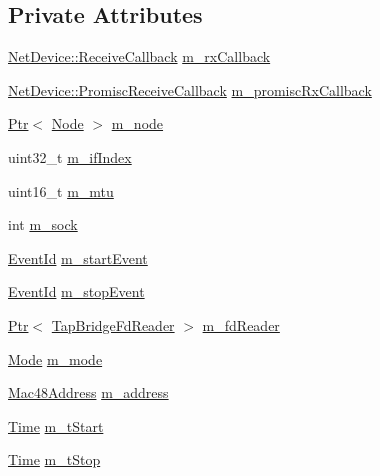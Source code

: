 \subsection*{Private Attributes}
\begin{DoxyCompactItemize}
\item 
\hyperlink{classns3_1_1NetDevice_ad5e5e1ca187472bc2ba99575d8def568}{Net\+Device\+::\+Receive\+Callback} \hyperlink{classns3_1_1TapBridge_a6e0e402ed4fc1b67796220bf915cfbae}{m\+\_\+rx\+Callback}
\item 
\hyperlink{classns3_1_1NetDevice_a427225795919f26c414bee2ea3f31ed2}{Net\+Device\+::\+Promisc\+Receive\+Callback} \hyperlink{classns3_1_1TapBridge_a4a1f6dcd199836a8bff03691a240af4a}{m\+\_\+promisc\+Rx\+Callback}
\item 
\hyperlink{classns3_1_1Ptr}{Ptr}$<$ \hyperlink{classns3_1_1Node}{Node} $>$ \hyperlink{classns3_1_1TapBridge_aab85ad5d27b8de91e7a02e8d8ee4332e}{m\+\_\+node}
\item 
uint32\+\_\+t \hyperlink{classns3_1_1TapBridge_a5de0f6399c095a680978c72bcd90b228}{m\+\_\+if\+Index}
\item 
uint16\+\_\+t \hyperlink{classns3_1_1TapBridge_a8aca7b3808d23f6a5f8e6c212c0af618}{m\+\_\+mtu}
\item 
int \hyperlink{classns3_1_1TapBridge_a52d87d41aa840377feebe63b5c5f2f3c}{m\+\_\+sock}
\item 
\hyperlink{classns3_1_1EventId}{Event\+Id} \hyperlink{classns3_1_1TapBridge_ad3b52854cf5e27c04fcbf62030e725ec}{m\+\_\+start\+Event}
\item 
\hyperlink{classns3_1_1EventId}{Event\+Id} \hyperlink{classns3_1_1TapBridge_aab982f716ac96e92e054c82334a198c4}{m\+\_\+stop\+Event}
\item 
\hyperlink{classns3_1_1Ptr}{Ptr}$<$ \hyperlink{classns3_1_1TapBridgeFdReader}{Tap\+Bridge\+Fd\+Reader} $>$ \hyperlink{classns3_1_1TapBridge_a8a26ef8616fb40272a4bab45ec84f563}{m\+\_\+fd\+Reader}
\item 
\hyperlink{classns3_1_1TapBridge_acac8d3ebe259ddfa9cd369515f04618d}{Mode} \hyperlink{classns3_1_1TapBridge_aaae30bc9d5dd36e3a4d569cf9bcf40eb}{m\+\_\+mode}
\item 
\hyperlink{classns3_1_1Mac48Address}{Mac48\+Address} \hyperlink{classns3_1_1TapBridge_a70e331b3deb893d7aa013ef44a7ee4a7}{m\+\_\+address}
\item 
\hyperlink{classns3_1_1Time}{Time} \hyperlink{classns3_1_1TapBridge_ad6cde3114d24223d3edf0270ce4af231}{m\+\_\+t\+Start}
\item 
\hyperlink{classns3_1_1Time}{Time} \hyperlink{classns3_1_1TapBridge_ae91102625b83c3b447f48d1798041ab8}{m\+\_\+t\+Stop}

\end{DoxyCompactItemize}
